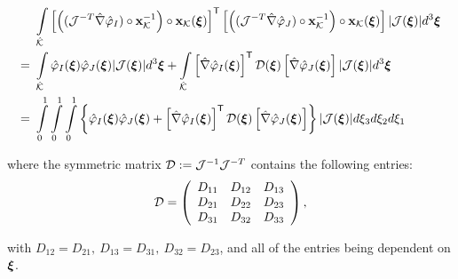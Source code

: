 \begin{align}
                                        \ & \int\limits_{\hat{\mathcal{K}}}
                                        \left[\left((\mathcal{J}^{-T}\hat{\nabla}\hat{\varphi}_I)\circ\mathbf{x}_{\mathcal{K}}^{-1}\right)\circ\mathbf{x}_{\mathcal{K}}(\boldsymbol{\xi})\right]^{\mathsf{T}} \left[\left((\mathcal{J}^{-T}\hat{\nabla}\hat{\varphi}_J)\circ\mathbf{x}_{\mathcal{K}}^{-1}\right)\circ\mathbf{x}_{\mathcal{K}}(\boldsymbol{\xi})\right]|\mathcal{J}(\boldsymbol{\xi})|d^3\boldsymbol{\xi} \nonumber\\
                                        =\ & \int\limits_{\hat{\mathcal{K}}}                \hat{\varphi}_I(\boldsymbol{\xi})\hat{\varphi}_J(\boldsymbol{\xi})|\mathcal{J}(\boldsymbol{\xi})|d^3\boldsymbol{\xi} +
                                        \int\limits_{\hat{\mathcal{K}}}             \left[\hat{\nabla}\hat{\varphi}_I(\boldsymbol{\xi})\right]^{\mathsf{T}}\mathcal{D}(\boldsymbol{\xi})\left[\hat{\nabla}\hat{\varphi}_J(\boldsymbol{\xi})\right]|\mathcal{J}(\boldsymbol{\xi})|d^3\boldsymbol{\xi} \nonumber\\
                                        =\ & \int\limits_0^1\int\limits_0^1\int\limits_0^1\left\{\hat{\varphi}_I(\boldsymbol{\xi})\hat{\varphi}_J(\boldsymbol{\xi})+\left[\hat{\nabla}\hat{\varphi}_I(\boldsymbol{\xi})\right]^{\mathsf{T}}\mathcal{D}(\boldsymbol{\xi})\left[\hat{\nabla}\hat{\varphi}_J(\boldsymbol{\xi})\right]\right\}|\mathcal{J}(\boldsymbol{\xi})|d\xi_3d\xi_2d\xi_1
    \label{h1ip_coupled}
\end{align}

\noindent where the symmetric matrix $\mathcal{D}:=\mathcal{J}^{-1}\mathcal{J}^{-T}$ contains the following entries:
% 
\begin{equation}
    \mathcal{D}=\left(
    \begin{array}{ccc}
         D_{11} & D_{12} & D_{13}  \\
         D_{21} & D_{22} & D_{23}  \\
         D_{31} & D_{32} & D_{33}
    \end{array}\right),
    \label{def_D}
\end{equation}

\noindent with $D_{12}=D_{21},\ D_{13}=D_{31},\ D_{32}=D_{23}$, and all of the entries being dependent on $\boldsymbol{\xi}$.

